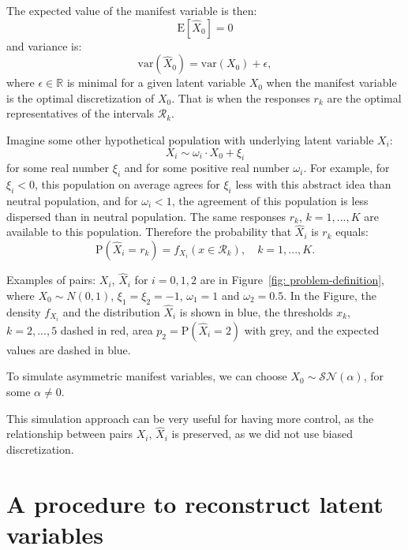 \documentclass[10pt]{article}
\begin{document}
The expected value of the manifest variable is then:
\begin{equation}
\mathrm{E}[\hat{X}_{0}] = 0
\end{equation}
and variance is:
\begin{equation}
\mathrm{var}(\hat{X}_{0}) = \mathrm{var}(X_{0}) + \epsilon,
\end{equation}
where $\epsilon \in \mathbb{R}$ is minimal for a given latent variable $X_{0}$ when the manifest variable is the optimal discretization of $X_{0}$. That is when the responses $r_{k}$ are the optimal representatives of the intervals $\mathcal{R}_{k}$. 

Imagine some other hypothetical population with underlying latent variable $X_{i}$:
\begin{equation}
X_{i} \sim \omega_{i} \cdot X_{0} + \xi_{i}
\end{equation}
for some real number $\xi_{i}$ and for some positive real number $\omega_{i}$. For example, for $\xi_{i} < 0$, this population on average agrees for $\xi_{i}$ less with this abstract idea than neutral population, and for $\omega_{i} < 1$, the agreement of this population is less dispersed than in neutral population. The same responses $r_{k}$, $k = 1,...,K$ are available to this population. Therefore the probability that $\hat{X}_{i}$ is $r_{k}$ equals:
\begin{equation}
\mathrm{P}(\hat{X}_{i} = r_{k}) = f_{X_{i}}(x \in \mathcal{R}_{k}), \quad k = 1, ..., K.
\end{equation}

Examples of pairs: $X_{i}$, $\hat{X}_{i}$ for $i=0,1,2$ are in Figure~\ref{fig: problem-definition}, where $X_{0} \sim N(0,1)$, $\xi_{1} = \xi_{2} = -1$, $\omega_{1}=1$ and $\omega_{2}=0.5$. In the Figure, the density $f_{X_{i}}$ and the distribution $\hat{X}_{i}$ is shown in blue, the thresholds $x_{k}$, $k = 2, ..., 5$ dashed in red, area $p_{2} = \mathrm{P}(\hat{X}_{i} = 2)$ with grey, and the expected values are dashed in blue.

To simulate asymmetric manifest variables, we can choose $X_{0} \sim \mathcal{SN}(\alpha)$, for some $\alpha \neq 0$. 

This simulation approach can be very useful for having more control, as the relationship between pairs $X_{i}$, $\hat{X}_{i}$ is preserved, as we did not use biased discretization.


\section{A procedure to reconstruct latent variables} \label{sec: reconstruction}
\end{document}

